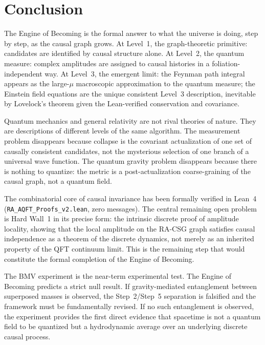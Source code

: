 \documentclass[11pt,a4paper]{article}
\theoremstyle{plain}
\theoremstyle{definition}
\theoremstyle{remark}
\begin{document}
\section{Conclusion}
\label{sec:conclusion}

The Engine of Becoming is the formal answer to what the universe is doing,
step by step, as the causal graph grows. At Level~1, the graph-theoretic
primitive: candidates are identified by causal structure alone. At Level~2,
the quantum measure: complex amplitudes are assigned to causal histories in a
foliation-independent way. At Level~3, the emergent limit: the Feynman path integral appears as the large-$\mu$ macroscopic
approximation to the quantum measure; the Einstein field equations are
the unique consistent Level~3 description, inevitable by Lovelock's
theorem given the Lean-verified conservation and covariance.

Quantum mechanics and general relativity are not rival theories of nature.
They are descriptions of different levels of the same algorithm. The
measurement problem disappears because collapse is the covariant actualization
of one set of causally consistent candidates, not the mysterious selection of
one branch of a universal wave function. The quantum gravity problem
disappears because there is nothing to quantize: the metric is a
post-actualization coarse-graining of the causal graph, not a quantum field.

The combinatorial core of causal invariance has been formally verified in
Lean~4 (\texttt{RA\_AQFT\_Proofs\_v2.lean}, zero messages). The central
remaining open problem is Hard Wall~1 in its precise form: the intrinsic
discrete proof of amplitude locality, showing that the local amplitude on the
RA-CSG graph satisfies causal independence as a theorem of the discrete
dynamics, not merely as an inherited property of the QFT continuum limit.
This is the remaining step that would constitute the formal completion of the
Engine of Becoming.

The BMV experiment is the near-term experimental test. The Engine of Becoming
predicts a strict null result. If gravity-mediated entanglement between
superposed masses is observed, the Step~2/Step~5 separation is falsified and
the framework must be fundamentally revised. If no such entanglement is
observed, the experiment provides the first direct evidence that spacetime is
not a quantum field to be quantized but a hydrodynamic average over an
underlying discrete causal process.
\end{document}
